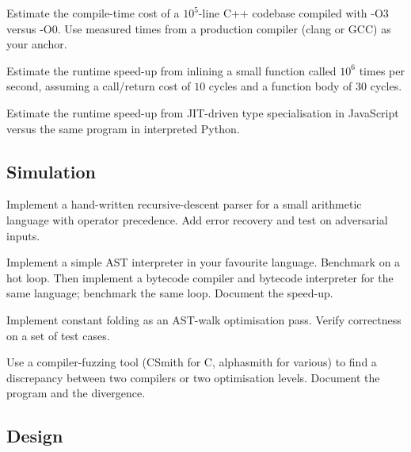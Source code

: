 \begin{exercise}
Estimate the compile-time cost of a $10^5$-line C++ codebase compiled with -O3 versus -O0. Use measured times from a production compiler (clang or GCC) as your anchor.
\end{exercise}

\begin{exercise}
Estimate the runtime speed-up from inlining a small function called $10^6$ times per second, assuming a call/return cost of $10$ cycles and a function body of $30$ cycles.
\end{exercise}

\begin{exercise}
Estimate the runtime speed-up from JIT-driven type specialisation in JavaScript versus the same program in interpreted Python.
\end{exercise}

\subsection*{Simulation}

\begin{exercise}
Implement a hand-written recursive-descent parser for a small arithmetic language with operator precedence. Add error recovery and test on adversarial inputs.
\end{exercise}

\begin{exercise}
Implement a simple AST interpreter in your favourite language. Benchmark on a hot loop. Then implement a bytecode compiler and bytecode interpreter for the same language; benchmark the same loop. Document the speed-up.
\end{exercise}

\begin{exercise}
Implement constant folding as an AST-walk optimisation pass. Verify correctness on a set of test cases.
\end{exercise}

\begin{exercise}
Use a compiler-fuzzing tool (CSmith for C, alphasmith for various) to find a discrepancy between two compilers or two optimisation levels. Document the program and the divergence.
\end{exercise}

\subsection*{Design}

